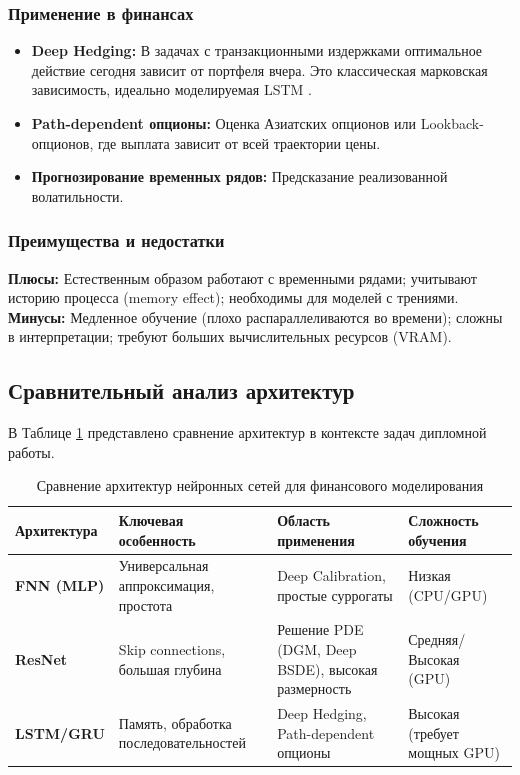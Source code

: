 \documentclass[12pt, a4paper]{article}
\begin{document}
\subsubsection{Применение в финансах}
\begin{itemize}
    \item \textbf{Deep Hedging:} В задачах с транзакционными издержками оптимальное действие сегодня зависит от портфеля вчера. Это классическая марковская зависимость, идеально моделируемая LSTM \cite{Buehler2019}.
    \item \textbf{Path-dependent опционы:} Оценка Азиатских опционов или Lookback-опционов, где выплата зависит от всей траектории цены.
    \item \textbf{Прогнозирование временных рядов:} Предсказание реализованной волатильности.
\end{itemize}

\subsubsection{Преимущества и недостатки}
\textbf{Плюсы:} Естественным образом работают с временными рядами; учитывают историю процесса (memory effect); необходимы для моделей с трениями. \\
\textbf{Минусы:} Медленное обучение (плохо распараллеливаются во времени); сложны в интерпретации; требуют больших вычислительных ресурсов (VRAM).

\subsection{Сравнительный анализ архитектур}

В Таблице \ref{tab:arch_comparison} представлено сравнение архитектур в контексте задач дипломной работы.

\begin{table}[h!]
    \centering
    \caption{Сравнение архитектур нейронных сетей для финансового моделирования}
    \label{tab:arch_comparison}
    \begin{tabular}{|p{3cm}|p{4cm}|p{4cm}|p{3.5cm}|}
        \hline
        \textbf{Архитектура} & \textbf{Ключевая особенность} & \textbf{Область применения} & \textbf{Сложность обучения} \\
        \hline
        \textbf{FNN (MLP)} & Универсальная аппроксимация, простота & Deep Calibration, простые суррогаты & Низкая (CPU/GPU) \\
        \hline
        \textbf{ResNet} & Skip connections, большая глубина & Решение PDE (DGM, Deep BSDE), высокая размерность & Средняя/Высокая (GPU) \\
        \hline
        \textbf{LSTM/GRU} & Память, обработка последовательностей & Deep Hedging, Path-dependent опционы & Высокая (требует мощных GPU) \\
        \hline
    \end{tabular}
\end{table}
\end{document}
